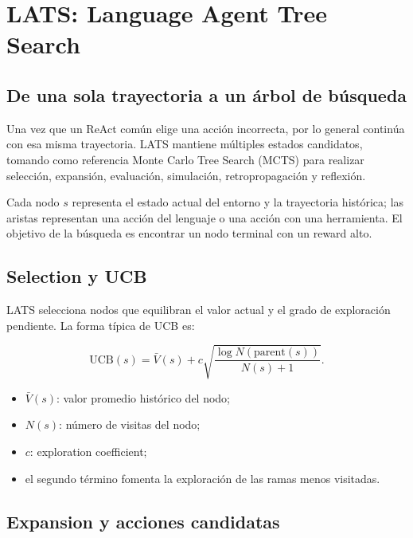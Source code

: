 \section{LATS: Language Agent Tree Search}

\subsection{De una sola trayectoria a un árbol de búsqueda}

Una vez que un ReAct común elige una acción incorrecta, por lo general continúa con esa misma trayectoria. LATS mantiene múltiples estados candidatos, tomando como referencia Monte Carlo Tree Search (MCTS) para realizar selección, expansión, evaluación, simulación, retropropagación y reflexión.



Cada nodo $s$ representa el estado actual del entorno y la trayectoria histórica; las aristas representan una acción del lenguaje o una acción con una herramienta. El objetivo de la búsqueda es encontrar un nodo terminal con un reward alto.

\subsection{Selection y UCB}

LATS selecciona nodos que equilibran el valor actual y el grado de exploración pendiente. La forma típica de UCB es:

$$
\mathrm{UCB}(s)=\bar V(s)+c\sqrt{\frac{\log N(\mathrm{parent}(s))}{N(s)+1}}.
$$

\begin{itemize}
    \item $\bar V(s)$: valor promedio histórico del nodo;
    \item $N(s)$: número de visitas del nodo;
    \item $c$: exploration coefficient;
    \item el segundo término fomenta la exploración de las ramas menos visitadas.
\end{itemize}

\subsection{Expansion y acciones candidatas}

